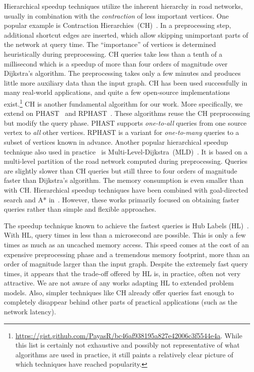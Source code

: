 \documentclass[manuscript,review]{acmart}
\begin{document}
Hierarchical speedup techniques utilize the inherent hierarchy in road networks, usually in combination with the \emph{contraction} of less important vertices.
One popular example is Contraction Hierarchies~(CH)~\cite{gssv-erlrn-12}.
In a preprocessing step, additional shortcut edges are inserted, which allow skipping unimportant parts of the network at query time.
The ``importance'' of vertices is determined heuristically during preprocessing.
CH queries take less than a tenth of a millisecond which is a speedup of more than four orders of magnitude over Dijkstra's algorithm.
The preprocessing takes only a few minutes and produces little more auxiliary data than the input graph.
CH has been used successfully in many real-world applications, and quite a few open-source implementations exist.\footnote{
\url{https://gist.github.com/PayasR/bc46af938195a827e42006c3f5544e4a}.
While this list is certainly not exhaustive and possibly not representative of what algorithms are used in practice, it still paints a relatively clear picture of which techniques have reached popularity.
}
CH is another fundamental algorithm for our work.
More specifically, we extend on PHAST~\cite{dgnw-phast-13} and RPHAST~\cite{delling_et_al:OASIcs:2011:3266}.
These algorithms reuse the CH preprocessing but modify the query phase.
PHAST supports \emph{one-to-all} queries from one source vertex to \emph{all} other vertices.
RPHAST is a variant for \emph{one-to-many} queries to a subset of vertices known in advance.
%
Another popular hierarchical speedup technique also used in practice~\cite{bingblog} is Multi-Level-Dijkstra~(MLD)~\cite{swz-umlgt-02}.
It is based on a multi-level partition of the road network computed during preprocessing.
Queries are slightly slower than CH queries but still three to four orders of magnitude faster than Dijkstra's algorithm.
The memory consumption is even smaller than with CH.
Hierarchical speedup techniques have been combined with goal-directed search and A* in~\cite{bdsssw-chgds-10,gkw-blwr-07,bdgwz-sfpcs-19}.
However, these works primarily focused on obtaining faster queries rather than simple and flexible approaches.

The speedup technique known to achieve the fastest queries is Hub Labels (HL)~\cite{DBLP:conf/esa/AbrahamDGW12,DBLP:conf/wea/DellingGW13}.
With HL, query times in less than a microsecond are possible.
This is only a few times as much as an uncached memory access.
This speed comes at the cost of an expensive preprocessing phase and a tremendous memory footprint, more than an order of magnitude larger than the input graph.
Despite the extremely fast query times, it appears that the trade-off offered by HL is, in practice, often not very attractive.
We are not aware of any works adapting HL to extended problem models.
Also, simpler techniques like CH already offer queries fast enough to completely disappear behind other parts of practical applications (such as the network latency).
\end{document}
